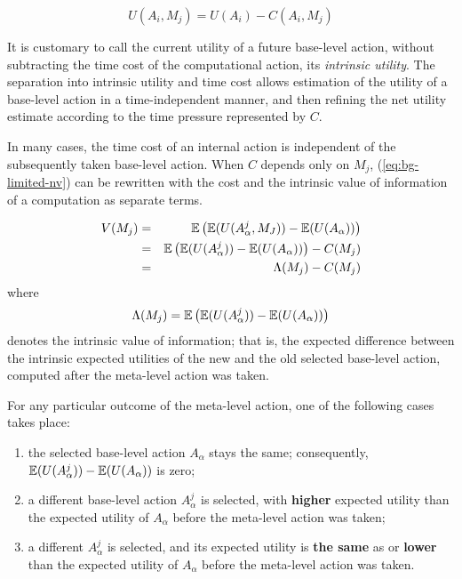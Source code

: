 \begin{equation}
\label{eq:bg-limited-iu}
U(A_i, M_j) = U(A_i) - C(A_i, M_j)
\end{equation}

It is customary to call the current utility of a future base-level
action, without subtracting the time cost of the computational action,
its {\em intrinsic utility}. The separation into intrinsic
utility and time cost allows estimation of the utility of a base-level
action in a time-independent manner, and then refining the net utility
estimate according to the time pressure represented by $C$.

In many cases, the time cost of an internal action is independent of
the subsequently taken base-level action. When $C$ depends only on
$M_j$, (\ref{eq:bg-limited-nv}) can be rewritten with the cost and the
intrinsic value of information of a computation as separate terms.

\begin{eqnarray}
\label{eq:bg-limited-v=bc}
V(M_j)&=&\mathbb{E}\left(\mathbb{E}(U(A_\alpha^j, M_J))-\mathbb{E}(U(A_\alpha))\right)\nonumber\\
     &=&\mathbb{E}\left(\mathbb{E}(U(A_\alpha^j))-\mathbb{E}(U(A_\alpha))\right)-C(M_j)\\
     &=& \Lambda(M_j)-C(M_j)
\end{eqnarray}
where
\begin{equation}
\label{eq:bg-limited-benefit}
\Lambda(M_j)=\mathbb{E}\left(\mathbb{E}(U(A_\alpha^j))-\mathbb{E}(U(A_\alpha))\right)
\end{equation}
denotes the intrinsic value of information; that is, the expected
difference between the intrinsic expected utilities of the new
and the old selected base-level action, computed after the meta-level
action was taken.

For any particular outcome of the meta-level action, one of the
following cases takes place:

\begin{enumerate}
\item the selected base-level action $A_\alpha$ stays the same;
  consequently, $\mathbb{E}(U(A_\alpha^j))-\mathbb{E}(U(A_\alpha))$ is zero;
\item a different base-level action $A_\alpha^j$ is selected, with
  {\bf higher} expected utility than the expected utility of
  $A_\alpha$ before the meta-level action was taken;
\item a different $A_\alpha^j$ is selected, and its expected
  utility is {\bf the same} as or {\bf lower} than the expected
  utility of $A_\alpha$ before the meta-level action was taken.
\end{enumerate}

